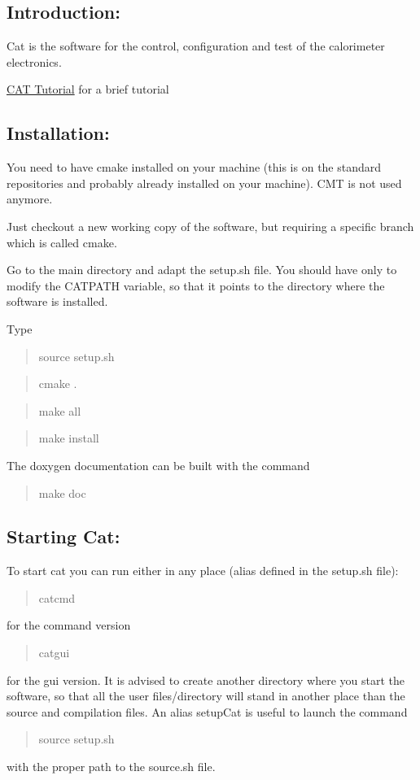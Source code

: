 \subsection*{Introduction\+: }

Cat is the software for the control, configuration and test of the calorimeter electronics.

\hyperlink{tutorial}{C\+AT Tutorial} for a brief tutorial

\subsection*{Installation\+: }

You need to have cmake installed on your machine (this is on the standard repositories and probably already installed on your machine). C\+MT is not used anymore.

Just checkout a new working copy of the software, but requiring a specific branch which is called cmake.

Go to the main directory and adapt the setup.\+sh file. You should have only to modify the C\+A\+T\+P\+A\+TH variable, so that it points to the directory where the software is installed.

Type

\begin{quote}
source setup.\+sh \end{quote}


\begin{quote}
cmake . \end{quote}


\begin{quote}
make all \end{quote}


\begin{quote}
make install \end{quote}
The doxygen documentation can be built with the command

\begin{quote}
make doc \end{quote}


\subsection*{Starting Cat\+: }

To start cat you can run either in any place (alias defined in the setup.\+sh file)\+:

\begin{quote}
catcmd \end{quote}
for the command version

\begin{quote}
catgui \end{quote}
for the gui version. It is advised to create another directory where you start the software, so that all the user files/directory will stand in another place than the source and compilation files. An alias setup\+Cat is useful to launch the command

\begin{quote}
source setup.\+sh \end{quote}
with the proper path to the source.\+sh file. 